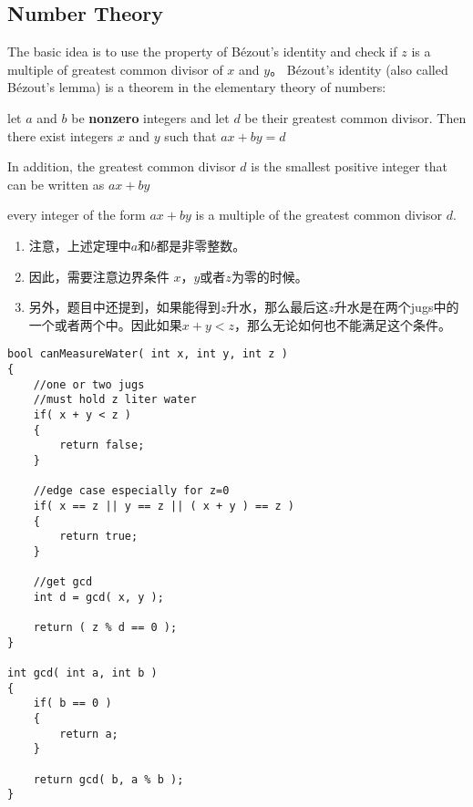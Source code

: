 \subsection{Number Theory}
The basic idea is to use the property of B\'{e}zout's identity and check if $ z $ is a multiple of greatest common divisor of $ x $ and $ y $。  B\'{e}zout's identity (also called  B\'{e}zout's lemma) is a theorem in the elementary theory of numbers:
\par
let $ a $ and $ b $ be \textbf{nonzero} integers and let $ d $ be their greatest common divisor. Then there exist integers $ x $ and $ y $ such that $ ax+by=d $
\par
In addition, the greatest common divisor $ d $ is the smallest positive integer that can be written as $ ax + by $
\par
every integer of the form $ ax + by $ is a multiple of the greatest common divisor $ d $.
\begin{enumerate}
\item 注意，上述定理中$ a $和$ b $都是非零整数。
\item 因此，需要注意边界条件 $ x $，$ y $或者$ z $为零的时候。
\item 另外，题目中还提到，如果能得到$z$升水，那么最后这$z$升水是在两个jugs中的一个或者两个中。因此如果$x+y<z$，那么无论如何也不能满足这个条件。
\end{enumerate}

\setcounter{lstlisting}{0}
\begin{lstlisting}[style=customc, caption={GCD}]
bool canMeasureWater( int x, int y, int z )
{
    //one or two jugs
    //must hold z liter water
    if( x + y < z )
    {
        return false;
    }

    //edge case especially for z=0
    if( x == z || y == z || ( x + y ) == z )
    {
        return true;
    }

    //get gcd
    int d = gcd( x, y );

    return ( z % d == 0 );
}

int gcd( int a, int b )
{
    if( b == 0 )
    {
        return a;
    }

    return gcd( b, a % b );
}
\end{lstlisting}
